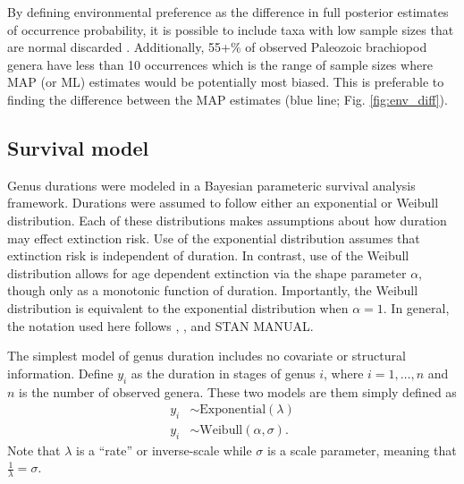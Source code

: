 \documentclass[12pt,letterpaper]{article}
\begin{document}
By defining environmental preference as the difference in full posterior estimates of occurrence probability, it is possible to include taxa with low sample sizes that are normal discarded \citep{Foote2006,Miller2001,Simpson2009,Kiessling2007a}. Additionally, 55+\% of observed Paleozoic brachiopod genera have less than 10 occurrences which is the range of sample sizes where MAP (or ML) estimates would be potentially most biased. This is preferable to finding the difference between the MAP estimates (blue line; Fig. \ref{fig:env_diff}).



\subsection{Survival model}

Genus durations were modeled in a Bayesian parameteric survival analysis framework. Durations were assumed to follow either an exponential or Weibull distribution. Each of these distributions makes assumptions about how duration may effect extinction risk. Use of the exponential distribution assumes that extinction risk is independent of duration. In contrast, use of the Weibull distribution allows for age dependent extinction via the shape parameter \(\alpha\), though only as a monotonic function of duration. Importantly, the Weibull distribution is equivalent to the exponential distribution when \(\alpha = 1\). In general, the notation used here follows \citet{Gelman2007}, \citet{Gelman2013d}, and \uppercase{stan manual}.

The simplest model of genus duration includes no covariate or structural information. Define \(y_{i}\) as the duration in stages of genus \(i\), where \(i = 1, \dots, n\) and \(n\) is the number of observed genera. These two models are them simply defined as
\begin{equation}
  \begin{aligned}
    y_{i} &\sim \mathrm{Exponential}(\lambda) \\
    y_{i} &\sim \mathrm{Weibull}(\alpha, \sigma).
  \end{aligned}
  \label{eq:simple}
\end{equation}
Note that \(\lambda\) is a ``rate'' or inverse-scale while \(\sigma\) is a scale parameter, meaning that \(\frac{1}{\lambda} = \sigma\).
\end{document}
